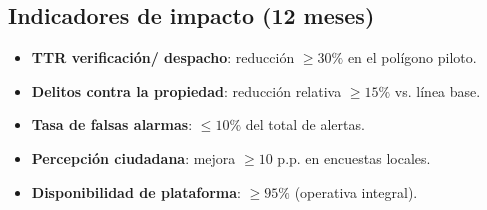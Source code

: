 \documentclass[12pt,a4paper]{article}
\begin{document}
\subsection*{Indicadores de impacto (12 meses)}
\begin{itemize}
  \item \textbf{TTR verificación/ despacho}: reducción \(\geq 30\%\) en el polígono piloto.
  \item \textbf{Delitos contra la propiedad}: reducción relativa \(\geq 15\%\) vs. línea base.
  \item \textbf{Tasa de falsas alarmas}: \(\leq 10\%\) del total de alertas.
  \item \textbf{Percepción ciudadana}: mejora \(\geq 10\) p.p. en encuestas locales.
  \item \textbf{Disponibilidad de plataforma}: \(\geq 95\%\) (operativa integral).
\end{itemize}
\end{document}
